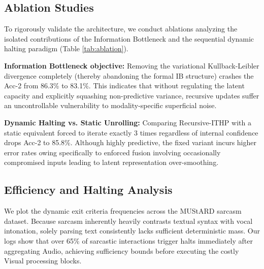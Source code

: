 \documentclass[11pt]{article}
\begin{document}
\subsection{Ablation Studies}
To rigorously validate the architecture, we conduct ablations analyzing the isolated contributions of the Information Bottleneck and the sequential dynamic halting paradigm (Table \ref{tab:ablation}).

\begin{table}[h]
  \caption{Ablation study dissecting components on MOSI.}
  \label{tab:ablation}
  \centering
\end{table}

\textbf{Information Bottleneck objective:} Removing the variational Kullback-Leibler divergence completely (thereby abandoning the formal IB structure) crashes the Acc-2 from 86.3\% to 83.1\%. This indicates that without regulating the latent capacity and explicitly squashing non-predictive variance, recursive updates suffer an uncontrollable vulnerability to modality-specific superficial noise.

\textbf{Dynamic Halting vs. Static Unrolling:} Comparing Recursive-ITHP with a static equivalent forced to iterate exactly 3 times regardless of internal confidence drops Acc-2 to 85.8\%. Although highly predictive, the fixed variant incurs higher error rates owing specifically to enforced fusion involving occasionally compromised inputs leading to latent representation over-smoothing.

\subsection{Efficiency and Halting Analysis}
We plot the dynamic exit criteria frequencies across the MUStARD sarcasm dataset. Because sarcasm inherently heavily contrasts textual syntax with vocal intonation, solely parsing text consistently lacks sufficient deterministic mass. Our logs show that over 65\% of sarcastic interactions trigger halts immediately after aggregating Audio, achieving sufficiency bounds before executing the costly Visual processing blocks. 
\end{document}
